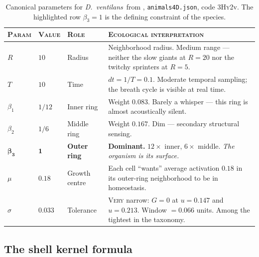 \documentclass[11pt,a4paper]{article}
\newcommand{\spc}[1]{\textit{#1}}  %
\newcommand{\DV}{\spc{D.\ ventilans}}
\begin{document}
\begin{table}[h!]
\small\sffamily
\renewcommand{\arraystretch}{1.25}
\begin{tabularx}{\linewidth}{@{}lll>{\raggedright\arraybackslash}X@{}}
\toprule
\textsc{Param} & \textsc{Value} & \textsc{Role} & \textsc{Ecological interpretation}\\
\midrule
$R$          & $10$    & Radius       & Neighborhood radius. Medium range --- neither the slow giants at $R=20$ nor the twitchy sprinters at $R=5$.\\
$T$          & $10$    & Time         & $dt=1/T=0.1$. Moderate temporal sampling; the breath cycle is visible at real time.\\
$\beta_{1}$  & $1/12$  & Inner ring   & Weight $0.083$. Barely a whisper --- this ring is almost acoustically silent.\\
$\beta_{2}$  & $1/6$   & Middle ring  & Weight $0.167$. Dim --- secondary structural sensing.\\
\rowcolor{codebg}$\boldsymbol{\beta_{3}}$ & $\mathbf{1}$ & \textbf{Outer ring} & \textbf{Dominant.} $12\times$ inner, $6\times$ middle. \textit{The organism \emph{is} its surface.}\\
$\mu$        & $0.18$  & Growth centre & Each cell ``wants'' average activation $0.18$ in its outer-ring neighborhood to be in homeostasis.\\
$\sigma$     & $0.033$ & Tolerance    & \textsc{Very} narrow: $G=0$ at $u=0.147$ and $u=0.213$. Window $=0.066$ units. Among the tightest in the taxonomy.\\
\bottomrule
\end{tabularx}
\caption{\small Canonical parameters for \DV\ from \citet{chan2020},
\texttt{animals4D.json}, code 3\textsc{Hy}2v. The highlighted row
$\beta_{3}=1$ is the defining constraint of the species.}
\end{table}

\subsection{The shell kernel formula}
\end{document}
